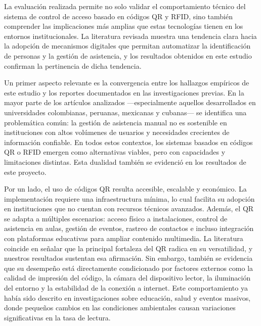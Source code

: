 La evaluación realizada permite no solo validar el comportamiento técnico del sistema de control de acceso basado en códigos QR y RFID, sino también comprender las implicaciones más amplias que estas tecnologías tienen en los entornos institucionales. La literatura revisada muestra una tendencia clara hacia la adopción de mecanismos digitales que permitan automatizar la identificación de personas y la gestión de asistencia, y los resultados obtenidos en este estudio confirman la pertinencia de dicha tendencia.

Un primer aspecto relevante es la convergencia entre los hallazgos empíricos de este estudio y los reportes documentados en las investigaciones previas. En la mayor parte de los artículos analizados —especialmente aquellos desarrollados en universidades colombianas, peruanas, mexicanas y cubanas— se identifica una problemática común: la gestión de asistencia manual no es sostenible en instituciones con altos volúmenes de usuarios y necesidades crecientes de información confiable. En todos estos contextos, los sistemas basados en códigos QR o RFID emergen como alternativas viables, pero con capacidades y limitaciones distintas. Esta dualidad también se evidenció en los resultados de este proyecto.

Por un lado, el uso de códigos QR resulta accesible, escalable y económico. La implementación requiere una infraestructura mínima, lo cual facilita su adopción en instituciones que no cuentan con recursos técnicos avanzados. Además, el QR se adapta a múltiples escenarios: acceso físico a instalaciones, control de asistencia en aulas, gestión de eventos, rastreo de contactos e incluso integración con plataformas educativas para ampliar contenido multimedia. La literatura coincide en señalar que la principal fortaleza del QR radica en su versatilidad, y nuestros resultados sustentan esa afirmación. Sin embargo, también se evidencia que su desempeño está directamente condicionado por factores externos como la calidad de impresión del código, la cámara del dispositivo lector, la iluminación del entorno y la estabilidad de la conexión a internet. Este comportamiento ya había sido descrito en investigaciones sobre educación, salud y eventos masivos, donde pequeños cambios en las condiciones ambientales causan variaciones significativas en la tasa de lectura.

